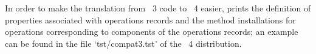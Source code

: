 In order to make the translation from {\GAP}~3 code to {\GAP}~4 easier,
{\GAP} prints the definition of properties associated with
operations records and the method installations for operations
corresponding to components of the operations records;
an example can be found in the file `tst/compat3.tst' of the {\GAP}~4
distribution.


